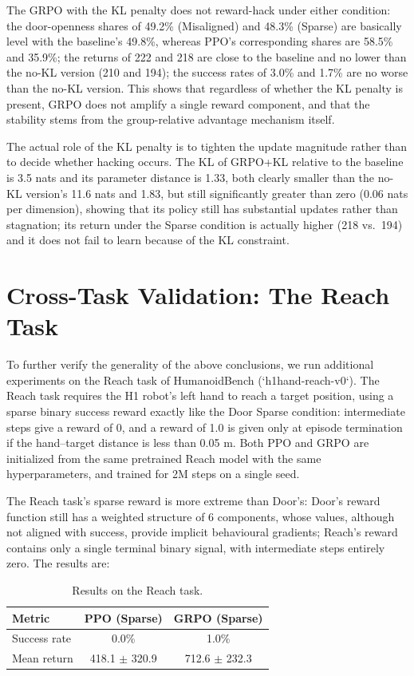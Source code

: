 The GRPO with the KL penalty does not reward-hack under either condition: the door-openness shares of 49.2\% (Misaligned) and 48.3\% (Sparse) are basically level with the baseline's 49.8\%, whereas PPO's corresponding shares are 58.5\% and 35.9\%; the returns of 222 and 218 are close to the baseline and no lower than the no-KL version (210 and 194); the success rates of 3.0\% and 1.7\% are no worse than the no-KL version. This shows that regardless of whether the KL penalty is present, GRPO does not amplify a single reward component, and that the stability stems from the group-relative advantage mechanism itself.

The actual role of the KL penalty is to tighten the update magnitude rather than to decide whether hacking occurs. The KL of GRPO+KL relative to the baseline is 3.5 nats and its parameter distance is 1.33, both clearly smaller than the no-KL version's 11.6 nats and 1.83, but still significantly greater than zero (0.06 nats per dimension), showing that its policy still has substantial updates rather than stagnation; its return under the Sparse condition is actually higher (218 vs.\ 194) and it does not fail to learn because of the KL constraint.

\section{Cross-Task Validation: The Reach Task}

To further verify the generality of the above conclusions, we run additional experiments on the Reach task of HumanoidBench (`h1hand-reach-v0`). The Reach task requires the H1 robot's left hand to reach a target position, using a sparse binary success reward exactly like the Door Sparse condition: intermediate steps give a reward of 0, and a reward of 1.0 is given only at episode termination if the hand--target distance is less than 0.05 m. Both PPO and GRPO are initialized from the same pretrained Reach model with the same hyperparameters, and trained for 2M steps on a single seed.

The Reach task's sparse reward is more extreme than Door's: Door's reward function still has a weighted structure of 6 components, whose values, although not aligned with success, provide implicit behavioural gradients; Reach's reward contains only a single terminal binary signal, with intermediate steps entirely zero. The results are:

\begin{table}[h]
\centering
\begin{tabular}{lcc}
\hline
Metric & PPO (Sparse) & GRPO (Sparse) \\
\hline
Success rate & 0.0\% & 1.0\% \\
Mean return & 418.1 $\pm$ 320.9 & 712.6 $\pm$ 232.3 \\
\hline
\end{tabular}
\caption{Results on the Reach task.}
\label{tab:reach}
\end{table}


